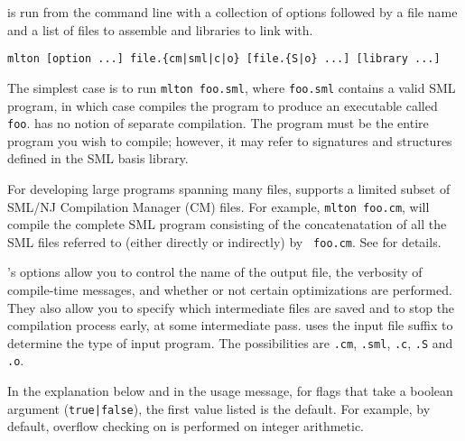 
{\mlton} is run from the command line with a collection of options followed by a
file name and a list of files to assemble and libraries to link with.
\begin{verbatim}
mlton [option ...] file.{cm|sml|c|o} [file.{S|o} ...] [library ...]
\end{verbatim}
The simplest case is to run {\tt mlton foo.sml}, where {\tt foo.sml} contains a
valid SML program, in which case {\mlton} compiles the program to produce an
executable called {\tt foo}.  {\mlton} has no notion of separate compilation.
The program must be the entire program you wish to compile; however, it may
refer to signatures and structures defined in the SML basis library.

For developing large programs spanning many files, {\mlton} supports a limited
subset of SML/NJ Compilation Manager (CM) files.  For example, {\tt mlton
foo.cm}, will compile the complete SML program consisting of the concatenatation
of all the SML files referred to (either directly or indirectly) by {\tt
foo.cm}.  See  for details.


{\mlton}'s options allow you to control the name of the output file, the
verbosity of compile-time messages, and whether or not certain optimizations are
performed.  They also allow you to specify which intermediate files are saved
and to stop the compilation process early, at some intermediate pass.  {\mlton}
uses the input file suffix to determine the type of input program.  The
possibilities are {\tt .cm}, {\tt .sml}, {\tt .c}, {\tt .S} and {\tt .o}.

In the explanation below and in the usage message, for flags that take a boolean
argument ({\tt {true|false}}), the first value listed is the default.  For
example, by default, overflow checking on is performed on integer arithmetic.

\newcommand{\option}[1]{\item[{\tt #1}]\hspace{1em}\\}

